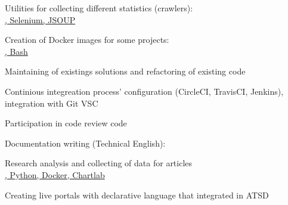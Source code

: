 \begin{cventries}
{\begin{cvitems}
{        }
        \item { Utilities for collecting different statistics (crawlers):
         \\ \href{https://github.com/axibase/atsd-data-crawlers/tree/energinet-grabber}{\faGithubSquare\acvHeaderIconSep\@Java, Selenium, JSOUP}
        }
        \item { Creation of Docker images for some projects:
         \\ \href{https://github.com/axibase/atsd-data-crawlers/tree/energinet-grabber-docker}{\faGithubSquare\acvHeaderIconSep\@Docker, Bash}
        }
        \item{Maintaining of existings solutions and refactoring of existing code}
        \item{Continious integreation process' configuration (CircleCI, TravisCI, Jenkins), integration with Git VSC}
        \item{Participation in code review code}
        \item{Documentation writing (Technical English):
          \\ \href{https://github.com/axibase/atsd}{\faGithubSquare\acvHeaderIconSep\@Markdown}
        }
        \item{Research analysis and collecting of data for articles
          \\ \href{https://github.com/axibase/atsd-use-cases}{\faGithubSquare\acvHeaderIconSep\@Bash, Python, Docker, Chartlab}
        }
        \item{Creating live portals with declarative language that integrated in ATSD}
      \end{cvitems}
    }


\end{cventries}

